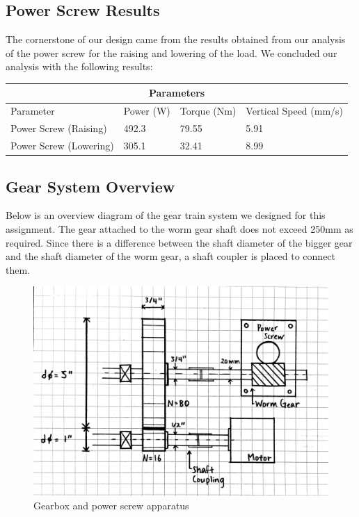 \documentclass[letterpaper,12pt]{article}
\begin{document}
\subsection{Power Screw Results}
The cornerstone of our design came from the results obtained from our analysis of the power screw for the raising and lowering of the load. We concluded our analysis with the following results:

\begin{center}
	\begin{tabular}{ |p{4.5cm}||p{2cm}|p{2.5cm}|p{4cm}|  }
		\hline
		\multicolumn{4}{|c|}{Parameters} \\
		\hline
		Parameter & Power (W) & Torque (Nm) & Vertical Speed (mm/s) \\
		\hline
		Power Screw (Raising) & 492.3 & 79.55 & 5.91 \\
		Power Screw (Lowering) & 305.1 & 32.41 & 8.99 \\
		\hline
	\end{tabular}
\end{center}

\subsection{Gear System Overview}
Below is an overview diagram of the gear train system we designed for this assignment. The gear attached to the worm gear shaft does not exceed 250mm as required. Since there is a difference between the shaft diameter of the bigger gear and the shaft diameter of the worm gear, a shaft coupler is placed to connect them.
\begin{figure}[!ht]
\includegraphics[width=16cm]{MECH325A1System}
\caption{Gearbox and power screw apparatus}
\end{figure}
\end{document}
